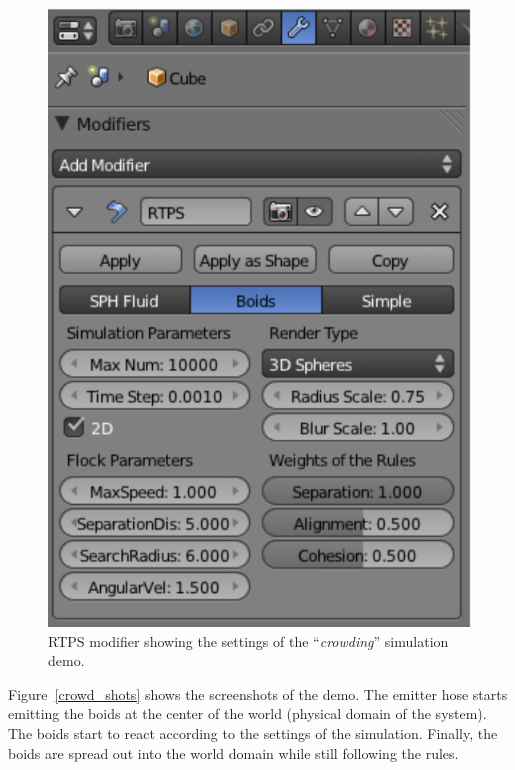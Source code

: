 \begin{figure}[htbp]
\begin{center}
\includegraphics[scale=0.8]{figures/demo_crowds_modifier.pdf}
\caption{RTPS modifier showing the settings of the ``\textit{crowding}'' simulation demo.}
\label{crowd_modifier}
\end{center}
\end{figure}

Figure~\ref{crowd_shots} shows the screenshots of the demo. The emitter hose starts emitting the boids at the center of the world (physical domain of the system). The boids start to react according to the settings of the simulation. Finally, the boids are spread out into the world domain while still following the rules.

